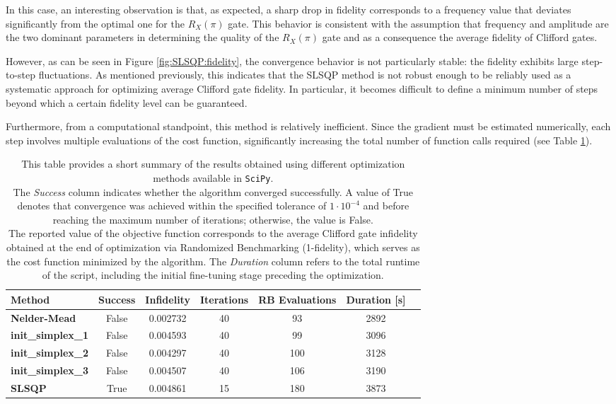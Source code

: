 In this case, an interesting observation is that, as expected, a sharp drop in fidelity corresponds to a frequency value that deviates significantly from the optimal one for the $R_X(\pi)$ gate.
This behavior is consistent with the assumption that frequency and amplitude are the two dominant parameters in determining the quality of the $R_X(\pi)$ gate and as a consequence the average fidelity of Clifford gates.

However, as can be seen in Figure \ref{fig:SLSQP:fidelity}, the convergence behavior is not particularly stable: the fidelity exhibits large step-to-step fluctuations. 
As mentioned previously, this indicates that the SLSQP method is not robust enough to be reliably used as a systematic approach for optimizing average Clifford gate fidelity.
In particular, it becomes difficult to define a minimum number of steps beyond which a certain fidelity level can be guaranteed.

Furthermore, from a computational standpoint, this method is relatively inefficient. 
Since the gradient must be estimated numerically, each step involves multiple evaluations of the cost function, significantly increasing the total number of function calls required (see Table \ref{tab:scipy_opt}).

\begin{table}[h]
    \centering
    \begin{tabular}{lcccccc}
        \toprule
        \textbf{Method} & \textbf{Success} & \textbf{Infidelity} & \textbf{Iterations} & \textbf{RB Evaluations} & \textbf{Duration [s]}\\
        \midrule
        \textbf{Nelder-Mead} & False & 0.002732 & 40 & 93 & 2892 \\
        \textbf{init\_simplex\_1} & False &  0.004593 & 40 & 99 & 3096\\
        \textbf{init\_simplex\_2} & False & 0.004297 & 40 & 100 & 3128\\
        \textbf{init\_simplex\_3} & False & 0.004507 & 40 & 106 & 3190\\
        \textbf{SLSQP} & True & 0.004861 & 15 & 180 & 3873\\
        \bottomrule
    \end{tabular}
    \caption{This table provides a short summary of the results obtained using different optimization methods available in \texttt{SciPy}.\\ 
    The \textit{Success} column indicates whether the algorithm converged successfully. 
    A value of True denotes that convergence was achieved within the specified tolerance of $1\cdot10^{-4}$ and before reaching the maximum number of iterations; otherwise, the value is False.\\
    The reported value of the objective function corresponds to the average Clifford gate infidelity obtained at the end of optimization via Randomized Benchmarking (1-fidelity), which serves as the cost function minimized by the algorithm.
    The \textit{Duration} column refers to the total runtime of the script, including the initial fine-tuning stage preceding the optimization.\\}
    \label{tab:scipy_opt}
\end{table}


